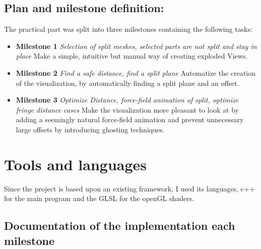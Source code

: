 \subsection{Plan and milestone definition:}
The practical part was split into three milestones containing the following tasks:
\begin{itemize}
\item \textbf{Milestone 1} \emph{Selection of split meshes, selected parts are not split and stay in place} Make a simple, intuitive but manual way of creating exploded Views.
\item \textbf{Milestone 2} \emph{Find a safe distance, find a split plane} Automatize the creation of the visualization, by automatically finding a split plane and an offset.
\item \textbf{Milestone 3} \emph{Optimize Distance, force-field animation of split, optimize fringe distance cases} Make the visualization more pleasant to look at by adding a seemingly natural force-field animation and prevent unnecessary large offsets by introducing ghosting techniques.
\end{itemize}
\section {Tools and languages}
Since the project is based upon an existing framework, I used its languages, c++ for the main program and the GLSL for the openGL shaders.
\subsection{Documentation of the implementation each milestone}
